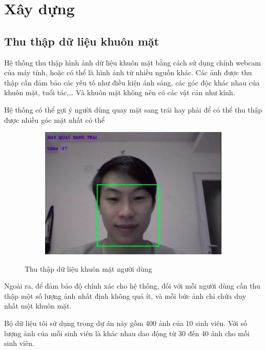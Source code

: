 \section{Xây dựng}

\subsection{Thu thập dữ liệu khuôn mặt}
Hệ thống thu thập hình ảnh dữ liệu khuôn mặt bằng cách sử dụng chính webcam
của máy tính, hoặc có thể là hình ảnh từ nhiều nguồn khác.
Các ảnh được thu thập cần đảm bảo các yếu tố như điều kiện ánh sáng,
các góc độc khác nhau của khuôn mặt, tuổi tác,…
Và khuôn mặt không nên có các vật cản như kính.

Hệ thống có thể gợi ý người dùng quay mặt sang trái hay phải để có thể thu thập được
nhiều góc mặt nhất có thể

\begin{figure}
    \begin{subfigure}{0.6\textwidth}
        \includegraphics[width=1\linewidth]{Chapters/items/chap3_2.jpg}
        \label{fig:chap3_2}
    \end{subfigure}
    \caption{Thu thập dữ liệu khuôn mặt người dùng}
\end{figure}

\newpage
Ngoài ra, để đảm bảo độ chính xác cho hệ thống, đối với mỗi người dùng
cần thu thập một số lượng ảnh nhất định không quá ít, và mỗi bức ảnh chỉ
chứa duy nhất một khuôn mặt.

Bộ dữ liệu tôi sử dụng trong dự án này gồm 400 ảnh của 10 sinh viên.
Với số lượng ảnh của mỗi sinh viên là khác nhau dao động từ 30 đến 40
ảnh cho mỗi sinh viên.

